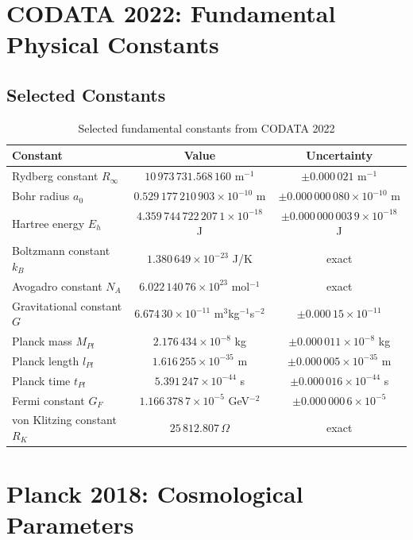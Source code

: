 \section{CODATA 2022: Fundamental Physical Constants}

\subsection{Selected Constants}

\begin{table}[h]
\centering
\begin{tabular}{lcc}
\hline
Constant & Value & Uncertainty \\
\hline
Rydberg constant $R_\infty$ & $10\,973\,731.568\,160$ m$^{-1}$ & $\pm0.000\,021$ m$^{-1}$ \\
Bohr radius $a_0$ & $0.529\,177\,210\,903\times10^{-10}$ m & $\pm0.000\,000\,080\times10^{-10}$ m \\
Hartree energy $E_h$ & $4.359\,744\,722\,207\,1\times10^{-18}$ J & $\pm0.000\,000\,003\,9\times10^{-18}$ J \\
Boltzmann constant $k_B$ & $1.380\,649\times10^{-23}$ J/K & exact \\
Avogadro constant $N_A$ & $6.022\,140\,76\times10^{23}$ mol$^{-1}$ & exact \\
Gravitational constant $G$ & $6.674\,30\times10^{-11}$ m$^3$kg$^{-1}$s$^{-2}$ & $\pm0.000\,15\times10^{-11}$ \\
Planck mass $M_{Pl}$ & $2.176\,434\times10^{-8}$ kg & $\pm0.000\,011\times10^{-8}$ kg \\
Planck length $l_{Pl}$ & $1.616\,255\times10^{-35}$ m & $\pm0.000\,005\times10^{-35}$ m \\
Planck time $t_{Pl}$ & $5.391\,247\times10^{-44}$ s & $\pm0.000\,016\times10^{-44}$ s \\
Fermi constant $G_F$ & $1.166\,378\,7\times10^{-5}$ GeV$^{-2}$ & $\pm0.000\,000\,6\times10^{-5}$ \\
von Klitzing constant $R_K$ & $25\,812.807\,\Omega$ & exact \\
\hline
\end{tabular}
\caption{Selected fundamental constants from CODATA 2022}
\end{table}

\section{Planck 2018: Cosmological Parameters}

